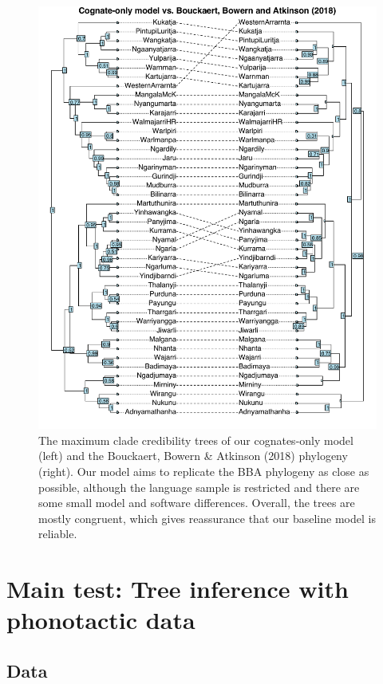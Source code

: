 \begin{figure}
\centering
\includegraphics{06-tree-inference/fig/cogs_vs_bba2018.pdf}
\caption[Maximum clade credibility trees of our cognates-only model and the Bouckaert, Bowern \& Atkinson (2018) phylogeny]{\label{fig:cogs-vs-bba2018}The maximum clade credibility trees of our cognates-only model (left) and the Bouckaert, Bowern \& Atkinson (2018) phylogeny (right). Our model aims to replicate the BBA phylogeny as close as possible, although the language sample is restricted and there are some small model and software differences. Overall, the trees are mostly congruent, which gives reassurance that our baseline model is reliable.}
\end{figure}

\hypertarget{main-test}{%
\section{Main test: Tree inference with phonotactic data}\label{main-test}}

\hypertarget{data}{%
\subsection{Data}\label{data}}

